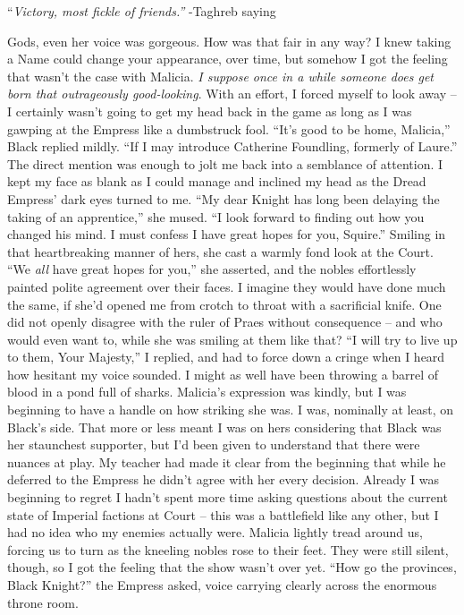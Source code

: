 \documentclass[12pt, openany]{book}
\begin{document}
“\textit{Victory, most fickle of friends.”}
-Taghreb saying

Gods, even her voice was gorgeous. How was that fair in any way? I knew taking a Name could change your appearance, over time, but somehow I got the feeling that wasn’t the case with Malicia. \textit{I suppose once in a while someone does get born that outrageously good-looking}. With an effort, I forced myself to look away – I certainly wasn’t going to get my head back in the game as long as I was gawping at the Empress like a dumbstruck fool.
“It’s good to be home, Malicia,” Black replied mildly. “If I may introduce Catherine Foundling, formerly of Laure.”
The direct mention was enough to jolt me back into a semblance of attention. I kept my face as blank as I could manage and inclined my head as the Dread Empress’ dark eyes turned to me.
“My dear Knight has long been delaying the taking of an apprentice,” she mused. “I look forward to finding out how you changed his mind. I must confess I have great hopes for you, Squire.”
Smiling in that heartbreaking manner of hers, she cast a warmly fond look at the Court.
“We \textit{all} have great hopes for you,” she asserted, and the nobles effortlessly painted polite agreement over their faces.
I imagine they would have done much the same, if she’d opened me from crotch to throat with a sacrificial knife. One did not openly disagree with the ruler of Praes without consequence – and who would even want to, while she was smiling at them like that?
“I will try to live up to them, Your Majesty,” I replied, and had to force down a cringe when I heard how hesitant my voice sounded.
I might as well have been throwing a barrel of blood in a pond full of sharks. Malicia’s expression was kindly, but I was beginning to have a handle on how striking she was. I was, nominally at least, on Black’s side. That more or less meant I was on hers considering that Black was her staunchest supporter, but I’d been given to understand that there were nuances at play. My teacher had made it clear from the beginning that while he deferred to the Empress he didn’t agree with her every decision. Already I was beginning to regret I hadn’t spent more time asking questions about the current state of Imperial factions at Court – this was a battlefield like any other, but I had no idea who my enemies actually were. Malicia lightly tread around us, forcing us to turn as the kneeling nobles rose to their feet. They were still silent, though, so I got the feeling that the show wasn’t over yet.
“How go the provinces, Black Knight?” the Empress asked, voice carrying clearly across the enormous throne room.
\end{document}
